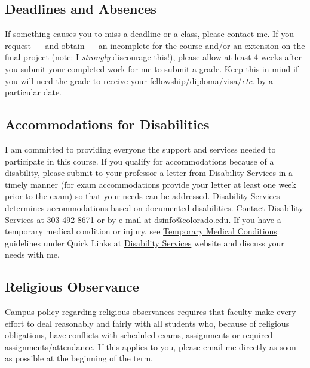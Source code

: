\documentclass[10pt]{memoir}
\begin{document}
\subsection{Deadlines and Absences}
If something causes you to miss a deadline or a class, please contact me. If you request --- and obtain --- an incomplete for the course and/or an extension on the final project (note: I \textit{strongly} discourage this!), please allow at least 4 weeks after you submit your completed work for me to submit a grade. Keep this in mind if you will need the grade to receive your fellowship/diploma/visa/\textit{etc}. by a particular date.

\subsection{Accommodations for Disabilities}
I am committed to providing everyone the support and services needed to participate in this course. If you qualify for accommodations because of a disability, please submit to your professor a letter from Disability Services in a timely manner (for exam accommodations provide your letter at least one week prior to the exam) so that your needs can be addressed. Disability Services determines accommodations based on documented disabilities. Contact Disability Services at 303-492-8671 or by e-mail at \href{mailto:dsinfo@colorado.edu}{dsinfo@colorado.edu}. If you have a temporary medical condition or injury, see \href{http://www.colorado.edu/disabilityservices/students/temporary-medical-conditions}{Temporary Medical Conditions} guidelines under Quick Links at \href{http://www.colorado.edu/disabilityservices/students}{Disability Services} website and discuss your needs with me.

\subsection{Religious Observance}
Campus policy regarding \href{http://www.colorado.edu/policies/observance-religious-holidays-and-absences-classes-andor-exams}{religious observances} requires that faculty make every effort to deal reasonably and fairly with all students who, because of religious obligations, have conflicts with scheduled exams, assignments or required assignments/attendance. If this applies to you, please email me directly as soon as possible at the beginning of the term. 
\end{document}
